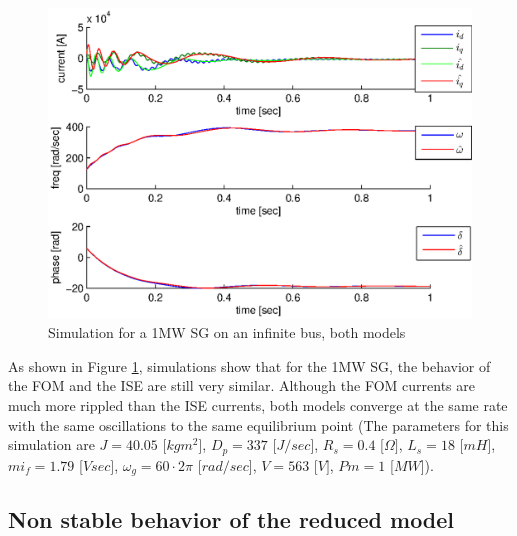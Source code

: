 \documentclass[conference]{IEEEtran}
\begin{document}
\begin{figure}[ht]
\includegraphics[scale=0.6]{sim1MWInfBus}

\caption{Simulation for a 1MW SG on an infinite bus, both models}
\label{fig:InfBusOne1MWSG}
\end{figure}

As shown in Figure \ref{fig:InfBusOne1MWSG}, simulations show that
for the 1MW SG, the behavior of the FOM and the ISE are still very similar. Although the FOM currents
are much more rippled than the ISE currents, both models converge
at the same rate with the same oscillations to the same equilibrium
point (The parameters for this simulation are $J=40.05$ {[}$kgm^{2}${]},
$D_{p}=337$ {[}$J/sec${]}, $R_{s}=0.4$ {[}$\Omega]$, $L_{s}=18$
{[}$mH${]}, $mi_{f}=1.79$ {[}$Vsec]$, $\omega_{g}=60\cdotp2\pi$
{[}$rad/sec${]}, $V=563$ {[}$V]$, $Pm=1$ {[}$MW${]}). 

\subsection{Non stable behavior of the reduced model}
\end{document}

